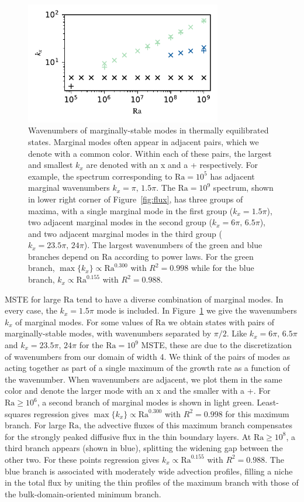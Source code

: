 \documentclass[reprint,amsmath,amssymb,aps,nofootinbib]{revtex4-1}
\newcommand\Ra{\mathrm{Ra}}
\begin{document}
\begin{figure}
    \centering
    \includegraphics[width=3.375in]{kx_m_ra1.pdf}
    \caption{Wavenumbers of marginally-stable modes in thermally equilibrated states. 
    Marginal modes often appear in adjacent pairs, which we denote with a common color. 
    Within each of these pairs, the largest and smallest $k_x$ are denoted with an x and a + respectively.
    For example, the spectrum corresponding to $\Ra = 10^5$ has adjacent marginal wavenumbers $k_x = \pi, \, 1.5\pi$. 
    The $\Ra = 10^9$ spectrum, shown in lower right corner of Figure~\ref{fig:flux}, has three groups of maxima, with a single marginal mode in the first group ($k_x = 1.5\pi$), two adjacent marginal modes in the second group ($k_x = 6\pi, \, 6.5\pi$), and two adjacent marginal modes in the third group ($k_x = 23.5\pi, \, 24\pi$). 
    The largest wavenumbers of the green and blue branches depend on  $\Ra$ according to power laws.
    For the green branch, $\max\{k_x\} \propto \Ra^{0.300}$ with $R^2 = 0.998$ while for the blue branch, $k_x \propto \Ra^{0.155}$ with $R^2 = 0.988$.}
    \label{fig:kx_marginals}
\end{figure}

MSTE for large $\Ra$ tend to have a diverse combination of marginal modes.
In every case, the $k_x = 1.5\pi$ mode is included. 
In Figure~\ref{fig:kx_marginals} we give the wavenumbers $k_x$ of marginal modes. 
For some values of $\Ra$ we obtain states with pairs of marginally-stable modes, with wavenumbers separated by $\pi/2$.
Like $k_x = 6\pi, \, 6.5\pi$ and $k_x=23.5\pi, \, 24\pi$ for the $\Ra=10^9$ MSTE, these are due to the discretization of wavenumbers from our domain of width 4.
We think of the pairs of modes as acting together as part of a single maximum of the growth rate as a function of the wavenumber.
When wavenumbers are adjacent, we plot them in the same color and denote the larger mode with an x and the smaller with a +.
For $\Ra \geq 10^6$, a second branch of marginal modes is shown in light green. 
Least-squares regression gives $\max\{k_x\} \propto \Ra^{0.300}$ with $R^2 = 0.998$ for this maximum branch.
For large $\Ra$, the advective fluxes of this maximum branch compensates for the strongly peaked diffusive flux in the thin boundary layers. 
At $\Ra \geq 10^8$, a third branch appears (shown in blue), splitting the widening gap between the other two. 
For these points regression gives $k_x \propto \Ra^{0.155}$ with $R^2 = 0.988$.
The blue branch is associated with moderately wide advection profiles, filling a niche in the total flux by uniting the thin profiles of the maximum branch with those of the bulk-domain-oriented minimum branch.
\end{document}
